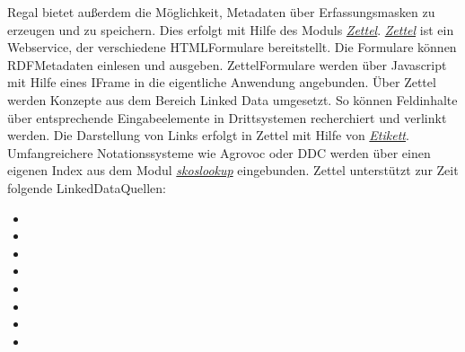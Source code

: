 \documentclass[letterpaper,10pt,english]{sphinxmanual}
\begin{document}
\sphinxAtStartPar
Regal bietet außerdem die Möglichkeit, Metadaten über Erfassungsmasken
zu erzeugen und zu speichern. Dies erfolgt mit Hilfe des Moduls
{\hyperref[\detokenize{toscience:_zettel}]{\emph{Zettel}}}. {\hyperref[\detokenize{toscience:_zettel}]{\emph{Zettel}}} ist ein Webservice, der
verschiedene HTML\sphinxhyphen{}Formulare bereitstellt. Die Formulare können
RDF\sphinxhyphen{}Metadaten einlesen und ausgeben. Zettel\sphinxhyphen{}Formulare werden über
Javascript mit Hilfe eines IFrame in die eigentliche Anwendung
angebunden. Über Zettel werden Konzepte aus dem Bereich Linked Data
umgesetzt. So können Feldinhalte über entsprechende Eingabeelemente in
Drittsystemen recherchiert und verlinkt werden. Die Darstellung von
Links erfolgt in Zettel mit Hilfe von {\hyperref[\detokenize{toscience:_etikett}]{\emph{Etikett}}}.
Umfangreichere Notationssysteme wie Agrovoc oder DDC werden über einen
eigenen Index aus dem Modul {\hyperref[\detokenize{toscience:_skos_lookup}]{\emph{skos\sphinxhyphen{}lookup}}} eingebunden.
Zettel unterstützt zur Zeit folgende Linked\sphinxhyphen{}Data\sphinxhyphen{}Quellen:
\begin{itemize}
\item {} 
\sphinxAtStartPar
{}

\item {} 
\sphinxAtStartPar
{}

\item {} 
\sphinxAtStartPar
{}

\item {} 
\sphinxAtStartPar
{}

\item {} 
\sphinxAtStartPar
{}

\item {} 
\sphinxAtStartPar
{}

\item {} 
\sphinxAtStartPar
{}

\item {} 
\sphinxAtStartPar
{}

\end{itemize}
\end{document}

